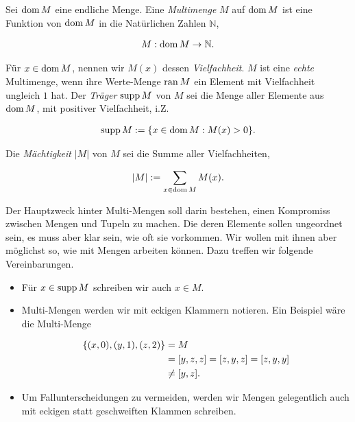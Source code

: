 \begin{definition}

    Sei $\operatorname{dom} M$ eine endliche Menge.
    Eine \textit{Multimenge} $M$ auf $\operatorname{dom} M$ ist eine Funktion von $\operatorname{dom} M$ in die Natürlichen Zahlen $\mathbb N$,

    \begin{align*}
        M: \operatorname{dom} M \to \mathbb N.
    \end{align*}

    Für $x \in \operatorname{dom} M$, nennen wir $M(x)$ dessen \textit{Vielfachheit}.
    $M$ ist eine \textit{echte} Multimenge, wenn ihre Werte-Menge $\operatorname{ran} M$ ein Element mit Vielfachheit ungleich $1$ hat.
    Der \textit{Träger} $\operatorname{supp} M$ von $M$ sei die Menge aller Elemente aus $\operatorname{dom} M$, mit positiver Vielfachheit, i.Z.
    
    \begin{align*}
        \operatorname{supp} M
        :=
        {\left \{ x \in \operatorname{dom} M: M(x) > 0 \right \}}.
    \end{align*}

    Die \textit{Mächtigkeit} $|M|$ von $M$ sei die Summe aller Vielfachheiten,

    \begin{align*}
        |M| := \sum_{x \in \operatorname{dom} M} M(x).
    \end{align*}

\end{definition}

Der Hauptzweck hinter Multi-Mengen soll darin bestehen, einen Kompromiss zwischen Mengen und Tupeln zu machen.
Die deren Elemente sollen ungeordnet sein, es muss aber klar sein, wie oft sie vorkommen.
Wir wollen mit ihnen aber möglichst so, wie mit Mengen arbeiten können.
Dazu treffen wir folgende Vereinbarungen.

\begin{itemize}

    \item Für $x \in \operatorname{supp} M$ schreiben wir auch $x \in M$.

    \item Multi-Mengen werden wir mit eckigen Klammern notieren.
    Ein Beispiel wäre die Multi-Menge
    
    \begin{align*}
        {\left \{ (x, 0), (y, 1), (z, 2) \right \}}
        & =
        M \\
        & =
        [y, z, z] = [z, y, z] = [z, y, y] \\
        & \neq
        [y, z].
    \end{align*}

    \item Um Fallunterscheidungen zu vermeiden, werden wir Mengen gelegentlich auch mit eckigen statt geschweiften Klammen schreiben.
    
\end{itemize}

